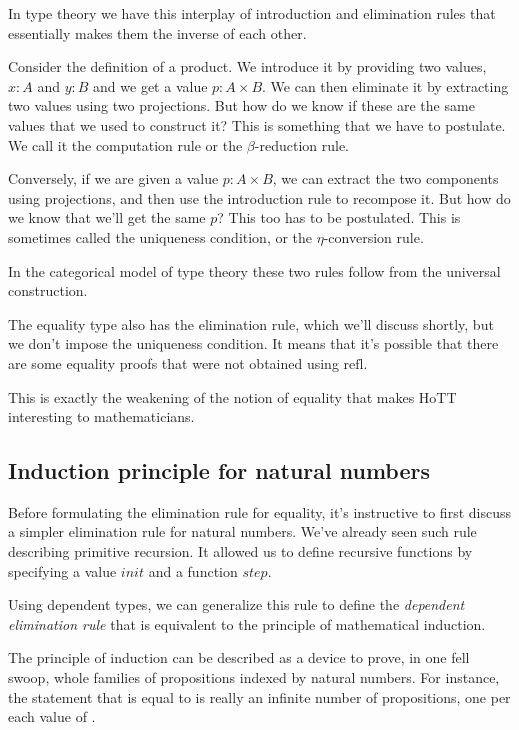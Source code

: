 \documentclass[DaoFP]{subfiles}
\begin{document}
In type theory we have this interplay of introduction and elimination rules that essentially makes them the inverse of each other. 

Consider the definition of a product. We introduce it by providing two values, $x \colon A$ and $y \colon B$ and we get a value $p \colon A \times B$. We can then eliminate it by extracting two values using two projections. But how do we know if these are the same values that we used to construct it? This is something that we have to postulate. We call it the computation rule or the $\beta$-reduction rule.

Conversely, if we are given a value $p \colon A \times B$, we can extract the two components using projections, and then use the introduction rule to recompose it. But how do we know that we'll get the same $p$? This too has to be postulated. This is sometimes called the uniqueness condition, or the $\eta$-conversion rule.

In the categorical model of type theory these two rules follow from the universal construction. 

The equality type also has the elimination rule, which we'll discuss shortly, but we don't impose the uniqueness condition. It means that it's possible that there are some equality proofs that were not obtained using $\text{refl}$. 

This is exactly the weakening of the notion of equality that makes HoTT interesting to mathematicians.

\subsection{Induction principle for natural numbers}

Before formulating the elimination rule for equality, it's instructive to first discuss a simpler elimination rule for natural numbers. We've already seen such rule describing primitive recursion. It allowed us to define recursive functions by specifying a value $\mathit{init}$ and a function $\mathit{step}$.

Using dependent types, we can generalize this rule to define the \emph{dependent elimination rule} that is equivalent to the principle of mathematical induction.

The principle of induction can be described as a device to prove, in one fell swoop, whole families of propositions indexed by natural numbers. For instance, the statement that  is equal to  is really an infinite number of propositions, one per each value of . 
\end{document}
